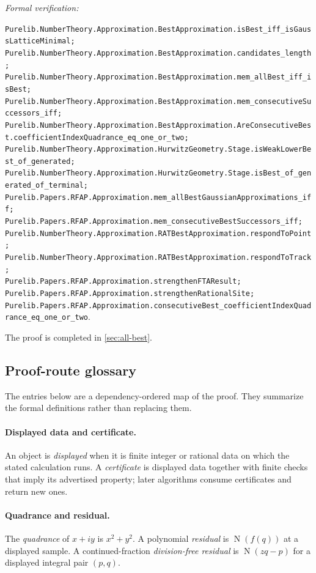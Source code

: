 \documentclass[11pt]{article}
\newcommand{\Norm}[1]{\operatorname{N}\!\left(#1\right)}
\newcommand{\leanref}[1]{\par\smallskip\noindent
  \emph{Formal verification:}\par\nobreak
  {\raggedright\nolinkurl{#1}.\par}}
\begin{document}
\leanref{Purelib.NumberTheory.Approximation.BestApproximation.isBest_iff_isGaussLatticeMinimal;
Purelib.NumberTheory.Approximation.BestApproximation.candidates_length;
Purelib.NumberTheory.Approximation.BestApproximation.mem_allBest_iff_isBest;
Purelib.NumberTheory.Approximation.BestApproximation.mem_consecutiveSuccessors_iff;
Purelib.NumberTheory.Approximation.BestApproximation.AreConsecutiveBest.coefficientIndexQuadrance_eq_one_or_two;
Purelib.NumberTheory.Approximation.HurwitzGeometry.Stage.isWeakLowerBest_of_generated;
Purelib.NumberTheory.Approximation.HurwitzGeometry.Stage.isBest_of_generated_of_terminal;
Purelib.Papers.RFAP.Approximation.mem_allBestGaussianApproximations_iff;
Purelib.Papers.RFAP.Approximation.mem_consecutiveBestSuccessors_iff;
Purelib.NumberTheory.Approximation.RATBestApproximation.respondToPoint;
Purelib.NumberTheory.Approximation.RATBestApproximation.respondToTrack;
Purelib.Papers.RFAP.Approximation.strengthenFTAResult;
Purelib.Papers.RFAP.Approximation.strengthenRationalSite;
Purelib.Papers.RFAP.Approximation.consecutiveBest_coefficientIndexQuadrance_eq_one_or_two}

The proof is completed in \cref{sec:all-best}.

\subsection{Proof-route glossary}
\label{sec:proof-route-glossary}

The entries below are a dependency-ordered map of the proof.  They summarize
the formal definitions rather than replacing them.

\paragraph{Displayed data and certificate.}
An object is \emph{displayed} when it is finite integer or rational data on
which the stated calculation runs.  A \emph{certificate} is displayed data
together with finite checks that imply its advertised property; later
algorithms consume certificates and return new ones.

\paragraph{Quadrance and residual.}
The \emph{quadrance} of $x+iy$ is $x^2+y^2$.  A polynomial \emph{residual}
is $\Norm{f(q)}$ at a displayed sample.  A continued-fraction
\emph{division-free residual} is $\Norm{zq-p}$ for a displayed integral pair
$(p,q)$.
\end{document}
